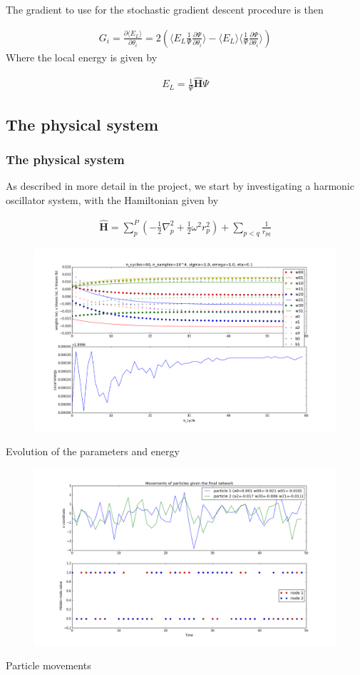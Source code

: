 \documentclass[norsk,a4paper,11pt]{beamer}
\begin{document}
\begin{frame}
The gradient to use for the stochastic gradient descent procedure is then

\begin{align}
	G_i = \frac{\partial \langle E_L \rangle}{\partial \theta_i}
	= 2(\langle E_L \frac{1}{\Psi}\frac{\partial \Psi}{\partial \theta_i} \rangle - \langle E_L \rangle \langle \frac{1}{\Psi}\frac{\partial \Psi}{\partial \theta_i} \rangle )
\end{align}
Where the local energy is given by

\begin{align}
	E_L = \frac{1}{\Psi} \hat{\mathbf{H}} \Psi
\end{align}
\end{frame}

\subsection{The physical system}
\begin{frame}
\frametitle{The physical system}
As described in more detail in the project, we start by investigating a harmonic oscillator system, with the Hamiltonian given by

\begin{align}
	\hat{\mathbf{H}} = \sum_p^P (-\frac{1}{2}\nabla_p^2 + \frac{1}{2}\omega^2 r_p^2 ) + \sum_{p<q} \frac{1}{r_{pq}}
\end{align}
\end{frame}

\begin{frame}
\begin{figure}
    \includegraphics[width=0.9\linewidth]{presentationMinimize.png}
\end{figure}
Evolution of the parameters and energy
\end{frame}

\begin{frame}
\begin{figure}
    \includegraphics[width=0.9\linewidth]{presParticles.png}
\end{figure}
\end{frame}
Particle movements
\end{document}
